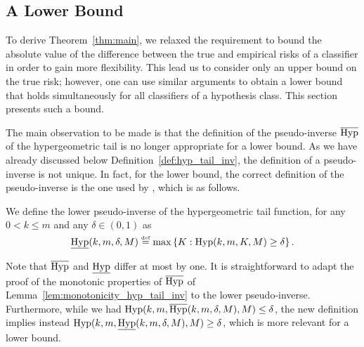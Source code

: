 \documentclass[twoside,11pt]{article}
\newcommand{\cb}[1]{\left\{#1\right\}}
\newcommand{\eqdef}{\overset{\smash{\mbox{\tiny \rm def}}}{=}}
\newcommand{\Hyp}{\textnormal{Hyp}}
\newcommand{\HypInv}{\overline{\textnormal{Hyp}}}
\newcommand{\HypInvLower}{\underline{\textnormal{Hyp}}}
\begin{document}
\subsection{A Lower Bound}
\label{ssec:lower_bound}

To derive Theorem~\ref{thm:main}, we relaxed the requirement to bound the absolute value of the difference between the true and empirical risks of a classifier in order to gain more flexibility.
This lead us to consider only an upper bound on the true risk; however, one can use similar arguments to obtain a lower bound that holds simultaneously for all classifiers of a hypothesis class.
This section presents such a bound.%

The main observation to be made is that the definition of the pseudo-inverse $\HypInv$ of the hypergeometric tail is no longer appropriate for a lower bound.
As we have already discussed below Definition~\ref{def:hyp_tail_inv}, the definition of a pseudo-inverse is not unique.
In fact, for the lower bound, the correct definition of the pseudo-inverse is the one used by \cite{le2016validation}, which is as follows.
\begin{definition}\label{def:hyp_tail_lower_inv}
We define the lower pseudo-inverse of the hypergeometric tail function, for any $0 < k \le m$ and any $\delta \in (0,1)$ as
\begin{equation*}
    \HypInvLower(k, m, \delta, M) \eqdef \max \cb{ K : \Hyp(k, m, K, M) \ge \delta }.
\end{equation*}
\end{definition}
Note that $\HypInv$ and $\HypInvLower$ differ at most by one.
It is straightforward to adapt the proof of the monotonic properties of $\HypInv$ of Lemma~\ref{lem:monotonicity_hyp_tail_inv} to the lower pseudo-inverse.
Furthermore, while we had $\Hyp(k,m,\HypInv(k,m,\delta,M),M) \le \delta$, the new definition implies instead $\Hyp(k,m,\HypInvLower(k,m,\delta,M),M) \ge \delta$, which is more relevant for a lower bound.
\end{document}
